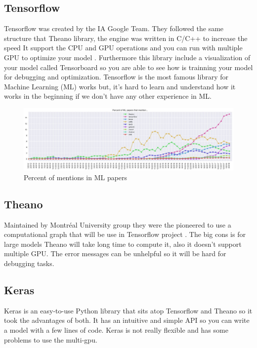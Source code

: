 \subsection[Tensorflow]{Tensorflow}
Tensorflow was created by the IA Google Team. They followed the same structure that Theano library, the engine was written in C/C++ to increase the speed \cite{generalcomparaison}
It support the CPU and GPU operations and you can run with multiple  GPU to optimize your model \cite{tensorflow}. Furthermore this library include a visualization of your model called Tensorboard so you are able to see how is trainning your model for debugging and optimization. Tensorflow is the most famous library for Machine Learning (ML) works but, it's hard to learn and understand how it works in the beginning if we don't have any other experience in ML.


\begin{figure}[H]
\centering
\includegraphics[width=1\textwidth]{./figures/libraries}
\caption{Percent of mentions in ML papers \cite{ml-mentions-image}}
\end{figure}


\subsection[Theano]{Theano}
Maintained by Montréal University group \cite{specificcomparaison} they were the pioneered to use a computational graph that will be use in Tensorflow project \cite{generalcomparaison}. The big cons is for large models Theano will take long time to compute it, also it doesn't support multiple GPU. The error messages can be unhelpful so it will be hard for debugging tasks.

\subsection[Keras]{Keras}
Keras is an easy-to-use Python library \cite{specificcomparaison}
that sits atop Tensorflow and Theano so it took the advantages of both. It has an intuitive and simple API so you can write a model with a few lines of code. Keras is not really flexible and has some problems to use the multi-gpu. 

